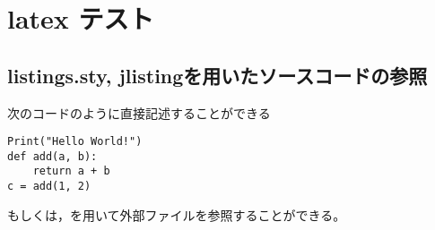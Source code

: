 \documentclass[]{corona-b5-1.1}%
\begin{document}
\setcounter{chapter}{0}
\setcounter{section}{0}

\section{latex テスト}

\subsection{listings.sty, jlistingを用いたソースコードの参照}
次のコードのように直接記述することができる
\begin{lstlisting}[caption=test, label=test]
Print("Hello World!")
def add(a, b):
    return a + b
c = add(1, 2)
\end{lstlisting}

もしくは，\verb||を用いて外部ファイルを参照することができる。

\end{document}
